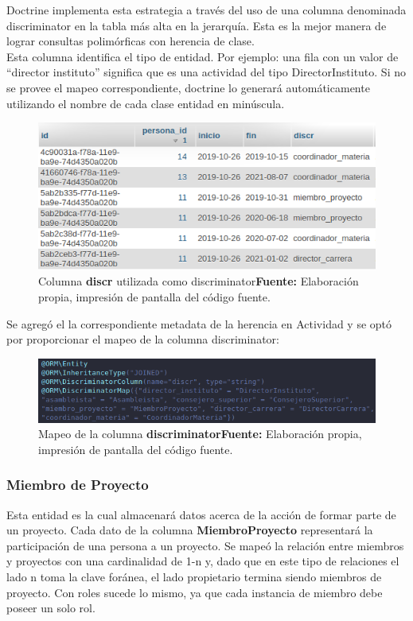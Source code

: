\documentclass{article}
\begin{document}
Doctrine implementa esta estrategia a través del uso de una columna denominada discriminator en la tabla más alta en la jerarquía\@. Esta es la mejor
manera de lograr consultas polimórficas con herencia de clase\@. \textcite{doctrine-inheritance}\\
\noindent
Esta columna identifica el tipo de entidad. Por ejemplo: una
fila con un valor de ``director instituto'' significa que es una actividad del tipo DirectorInstituto\@.
Si no se provee el mapeo correspondiente, doctrine lo generará automáticamente utilizando el nombre de cada clase entidad en minúscula\@. \textcite{doctrine-inheritance}

\begin{figure}[h]
    \includegraphics[width=1\linewidth]{image/discriminator-doctrine.png}
    \caption{Columna \textbf{discr} utilizada como discriminator\newline \textbf{Fuente:} Elaboración propia, impresión de pantalla del código fuente.}
    \label{fig:image/discriminator-doctrine.png}
\end{figure}
\newpage
Se agregó el la correspondiente metadata de la herencia en Actividad y se optó por proporcionar el mapeo de la columna discriminator:

\begin{figure}[h]
    \includegraphics[width=1\linewidth]{image/discr.png}
    \caption{Mapeo de la columna \textbf{discriminator}\newline \textbf{Fuente:} Elaboración propia, impresión de pantalla del código fuente.}
    \label{fig:image/discr.png}
\end{figure}

\subsubsection{Miembro de Proyecto}%
\label{ssub:miembro_de_proyecto_modelo}
Esta entidad es la cual almacenará datos acerca de la acción de formar parte de un proyecto. Cada dato de la columna \textbf{MiembroProyecto} representará la participación
de una persona a un proyecto\@.
Se mapeó la relación entre miembros y proyectos con una cardinalidad de 1-n y, dado que en este tipo de relaciones el lado n toma la clave foránea, el lado propietario termina siendo miembros de proyecto\@.
Con roles sucede lo mismo, ya que cada instancia de miembro debe poseer un solo rol.
\end{document}
